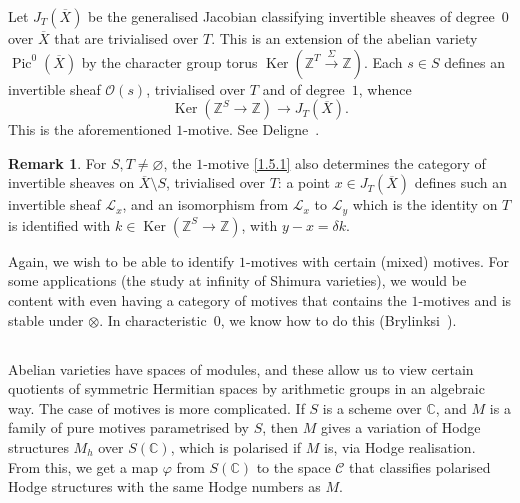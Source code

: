 \documentclass{article}
\theoremstyle{plain}
\theoremstyle{definition}
\newtheorem*{remark}{Remark}
\newcommand{\sh}[1]{{\mathscr{#1}}}
\newcommand{\ZZ}{\mathbb{Z}}
\newcommand{\CC}{\mathbb{C}}
\DeclareMathOperator{\Pic}{Pic}
\DeclareMathOperator{\Ker}{Ker}
\begin{document}
Let $J_T(\overline{X})$ be the generalised Jacobian classifying invertible sheaves of degree~$0$ over $\overline{X}$ that are trivialised over $T$.
This is an extension of the abelian variety $\Pic^0(\overline{X})$ by the character group torus $\Ker(\ZZ^T\xrightarrow{\Sigma}\ZZ)$.
Each $s\in S$ defines an invertible sheaf $\sh{O}(s)$, trivialised over $T$ and of degree~$1$, whence
\[
\label{1.5.1}
  \Ker(\ZZ^S\to\ZZ) \to J_T(\overline{X}).
\tag{1.5.1}
\]
This is the aforementioned $1$-motive.
See Deligne~\cite[\S10]{9}.

\begin{remark}
  For $S,T\neq\varnothing$, the $1$-motive \cref{1.5.1} also determines the category of invertible sheaves on $\overline{X}\setminus S$, trivialised over $T$: a point $x\in J_T(\overline{X})$ defines such an invertible sheaf $\sh{L}_x$, and an isomorphism from $\sh{L}_x$ to $\sh{L}_y$ which is the identity on $T$ is identified with $k\in\Ker(\ZZ^S\to\ZZ)$, with $y-x=\delta k$.
\end{remark}

Again, we wish to be able to identify $1$-motives with certain (mixed) motives.
For some applications (the study at infinity of Shimura varieties), we would be content with even having a category of motives that contains the $1$-motives and is stable under $\otimes$.
In characteristic~$0$, we know how to do this (Brylinksi~\cite{7}).


\subsection{}
\label{1.6}

Abelian varieties have spaces of modules, and these allow us to view certain quotients of symmetric Hermitian spaces by arithmetic groups in an algebraic way.
The case of motives is more complicated.
If $S$ is a scheme over $\CC$, and $M$ is a family of pure motives parametrised by $S$, then $M$ gives a variation of Hodge structures $M_h$ over $S(\CC)$, which is polarised if $M$ is, via Hodge realisation.
From this, we get a map $\varphi$ from $S(\CC)$ to the space $\mathscr{C}$ that classifies polarised Hodge structures with the same Hodge numbers as $M$.
\end{document}

